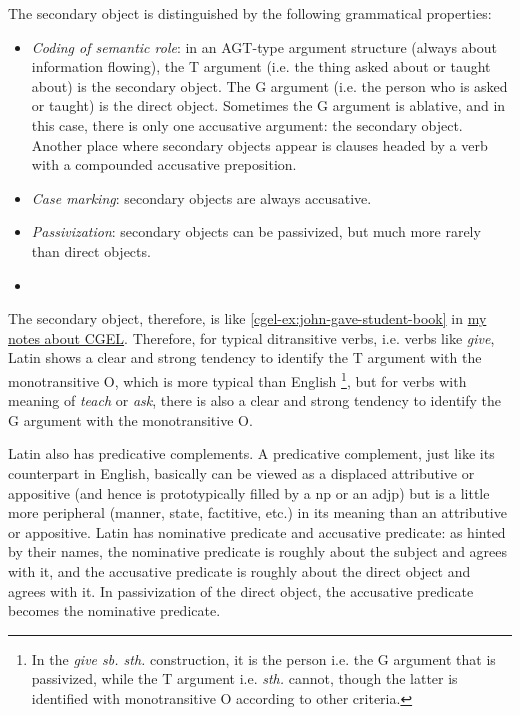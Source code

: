 \documentclass{article}
\newcommand*{\corpus}[1]{\emph{#1}}
\newcommand{\cgel}{\href{../English/cambridge.pdf}{my notes about CGEL}}
\begin{document}
The secondary object is distinguished by the following grammatical properties:
\begin{itemize}
    \item \emph{Coding of semantic role}: in an AGT-type argument structure (always about information flowing),
    the T argument (i.e. the thing asked about or taught about) is the secondary object.
    The G argument (i.e. the person who is asked or taught) is the direct object.
    Sometimes the G argument is ablative, and in this case, 
    there is only one accusative argument: the secondary object.
    Another place where secondary objects appear is 
    clauses headed by a verb with a compounded accusative preposition. %
    \item \emph{Case marking}: secondary objects are always accusative.
    \item \emph{Passivization}: secondary objects can be passivized, but much more rarely than direct objects.
    \item %
\end{itemize}
The secondary object, therefore, is like \eqref{cgel-ex:john-gave-student-book} in \cgel.
Therefore, for typical ditransitive verbs, i.e. verbs like \corpus{give}, 
Latin shows a clear and strong tendency to identify the T argument with the monotransitive O,
which is more typical than English%
\footnote{
    In the \corpus{give sb. sth.} construction, it is the person i.e. the G argument that is passivized,
    while the T argument i.e. \corpus{sth.} cannot, though the latter is identified with monotransitive O
    according to other criteria. 
},
but for verbs with meaning of \corpus{teach} or \corpus{ask},
there is also a clear and strong tendency to identify the G argument with the monotransitive O.

Latin also has predicative complements.
A predicative complement, just like its counterpart in English,
basically can be viewed as a displaced attributive or appositive 
(and hence is prototypically filled by a \ac{np} or an \acs{adjp})
but is a little more peripheral (manner, state, factitive, etc.) 
in its meaning than an attributive or appositive.
Latin has nominative predicate and accusative predicate:
as hinted by their names, 
the nominative predicate is roughly about the subject and agrees with it,
and the accusative predicate is roughly about the direct object and agrees with it.
In passivization of the direct object,
the accusative predicate becomes the nominative predicate.
\end{document}
